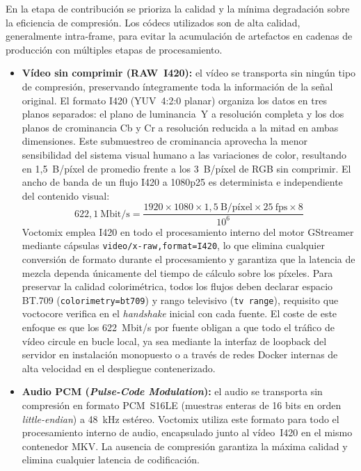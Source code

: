 En la etapa de contribución se prioriza la calidad y la mínima degradación sobre la
eficiencia de compresión. Los códecs utilizados son de alta calidad, generalmente
intra-frame, para evitar la acumulación de artefactos en cadenas de producción con
múltiples etapas de procesamiento.

\begin{itemize}
  \item \textbf{Vídeo sin comprimir (RAW~I420):} el vídeo se transporta sin ningún tipo
  de compresión, preservando íntegramente toda la información de la señal original. El
  formato I420 (YUV~4:2:0 planar) organiza los datos en tres planos separados: el plano
  de luminancia~Y a resolución completa y los dos planos de crominancia Cb y Cr a
  resolución reducida a la mitad en ambas dimensiones. Este submuestreo de crominancia
  aprovecha la menor sensibilidad del sistema visual humano a las variaciones de color,
  resultando en 1{,}5~B/píxel de promedio frente a los 3~B/píxel de RGB sin comprimir.
  El ancho de banda de un flujo I420 a 1080p25 es determinista e independiente del
  contenido visual:
  \[
    622{,}1~\text{Mbit/s}
    = \frac{1920 \times 1080 \times 1{,}5~\text{B/píxel} \times 25~\text{fps} \times 8}{10^6}
  \]
  Voctomix emplea I420 en todo el procesamiento interno del motor GStreamer mediante
  cápsulas \texttt{video/x-raw,format=I420}, lo que elimina cualquier conversión de
  formato durante el procesamiento y garantiza que la latencia de mezcla dependa
  únicamente del tiempo de cálculo sobre los píxeles. Para preservar la calidad colorimétrica,
  todos los flujos deben declarar espacio BT.709 (\texttt{colorimetry=bt709}) y rango
  televisivo (\texttt{tv~range}), requisito que voctocore verifica en el
  \textit{handshake} inicial con cada fuente. El coste de este enfoque es que los
  622~Mbit/s por fuente obligan a que todo el tráfico de vídeo circule en bucle local,
  ya sea mediante la interfaz de loopback del servidor en instalación monopuesto o a
  través de redes Docker internas de alta velocidad en el despliegue contenerizado.

  \item \textbf{Audio PCM (\textit{Pulse-Code Modulation}):} el audio se transporta sin
  compresión en formato PCM~S16LE (muestras enteras de 16 bits en orden
  \textit{little-endian}) a 48~kHz estéreo. Voctomix utiliza este formato para todo el
  procesamiento interno de audio, encapsulado junto al vídeo~I420 en el mismo contenedor
  MKV. La ausencia de compresión garantiza la máxima calidad y elimina cualquier
  latencia de codificación.


\end{itemize}
